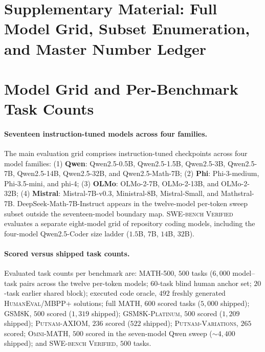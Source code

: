 
\setcounter{section}{0}
\renewcommand{\thesection}{S\arabic{section}}
\setcounter{table}{0}
\renewcommand{\thetable}{S\arabic{table}}
\setcounter{figure}{0}
\renewcommand{\thefigure}{S\arabic{figure}}

\section*{Supplementary Material: Full Model Grid, Subset Enumeration, and Master Number Ledger}

\section{Model Grid and Per-Benchmark Task Counts}
\label{sec:supp-grid}

\paragraph{Seventeen instruction-tuned models across four families.}
The main evaluation grid comprises instruction-tuned checkpoints across four model families: (1) \textbf{Qwen}: Qwen2.5-0.5B, Qwen2.5-1.5B, Qwen2.5-3B, Qwen2.5-7B, Qwen2.5-14B, Qwen2.5-32B, and Qwen2.5-Math-7B; (2) \textbf{Phi}: Phi-3-medium, Phi-3.5-mini, and phi-4; (3) \textbf{OLMo}: OLMo-2-7B, OLMo-2-13B, and OLMo-2-32B; (4) \textbf{Mistral}: Mistral-7B-v0.3, Ministral-8B, Mistral-Small, and Mathstral-7B.
DeepSeek-Math-7B-Instruct appears in the twelve-model per-token sweep subset outside the seventeen-model boundary map.
\textsc{SWE-bench Verified} evaluates a separate eight-model grid of repository coding models, including the four-model Qwen2.5-Coder size ladder ($1.5$B, $7$B, $14$B, $32$B).

\paragraph{Scored versus shipped task counts.}
Evaluated task counts per benchmark are: \textsc{MATH-500}, $500$ tasks ($6{,}000$ model--task pairs across the twelve per-token models; $60$-task blind human anchor set; $20$-task earlier shared block); executed code oracle, $492$ freshly generated \textsc{HumanEval}/\textsc{MBPP+} solutions; full \textsc{MATH}, $600$ scored tasks ($5{,}000$ shipped); \textsc{GSM8K}, $500$ scored ($1{,}319$ shipped); \textsc{GSM8K-Platinum}, $500$ scored ($1{,}209$ shipped); \textsc{Putnam-AXIOM}, $236$ scored ($522$ shipped); \textsc{Putnam-Variations}, $265$ scored; \textsc{Omni-MATH}, $500$ scored in the seven-model Qwen sweep ($\sim 4{,}400$ shipped); and \textsc{SWE-bench Verified}, $500$ tasks.

